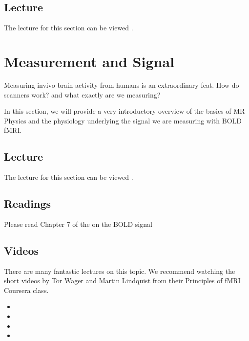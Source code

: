 \documentclass[letterpaper,10pt,english]{sphinxmanual}
\begin{document}
\subsection{Lecture}
\label{\detokenize{content/Intro_to_Neuroimaging:lecture}}
The lecture for this section can be viewed .


\section{Measurement and Signal}
\label{\detokenize{content/Signal_Measurement:measurement-and-signal}}\label{\detokenize{content/Signal_Measurement::doc}}
Measuring in\sphinxhyphen{}vivo brain activity from humans is an extraordinary feat. How do scanners work? and what exactly are we measuring?

In this section, we will provide a very introductory overview of the basics of MR Physics and the physiology underlying the signal we are measuring with BOLD fMRI.


\subsection{Lecture}
\label{\detokenize{content/Signal_Measurement:lecture}}
The lecture for this section can be viewed .


\subsection{Readings}
\label{\detokenize{content/Signal_Measurement:readings}}
Please read Chapter 7 of the  on the BOLD signal


\subsection{Videos}
\label{\detokenize{content/Signal_Measurement:videos}}
There are many fantastic lectures on this topic. We recommend watching the short videos by Tor Wager and Martin Lindquist from their Principles of fMRI Coursera class.
\begin{itemize}
\item {} 

\item {} 

\item {} 

\item {} 

\end{itemize}
\end{document}
